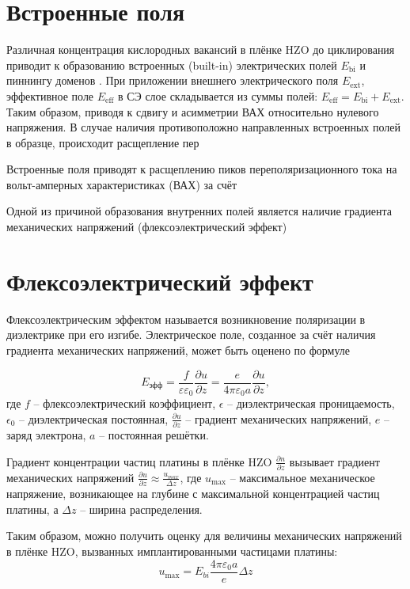 \section{Встроенные поля}

Различная концентрация кислородных вакансий в плёнке HZO до циклирования приводит к образованию встроенных (built-in) электрических полей \(E_\text{bi}\) и пиннингу доменов . При приложении внешнего электрического поля \(E_\text{ext}\), эффективное поле \(E_\text{eff}\) в СЭ слое складывается из суммы полей: \(E_\text{eff} = E_\text{bi} + E_\text{ext}\). Таким образом, приводя к сдвигу и асимметрии ВАХ относительно нулевого напряжения. В случае наличия противоположно направленных встроенных полей в образце, происходит расщепление пер

Встроенные поля приводят к расщеплению пиков переполяризационного тока на вольт-амперных характеристиках (ВАХ) за счёт

Одной из причиной образования внутренних полей является наличие градиента механических напряжений (флексоэлектрический эффект)

\section{Флексоэлектрический эффект}


Флексоэлектрическим эффектом называется возникновение поляризации в диэлектрике при его изгибе. Электрическое поле, созданное за счёт наличия градиента механических напряжений, может быть оценено по формуле \cite{gruvermanMechanicalStressEffect2003}

\[E_\text{эфф}=\frac{f}{\varepsilon\varepsilon_0}\frac{\partial u}{\partial z} = \frac{e}{4\pi\varepsilon_0 a}\frac{\partial u}{\partial z},\]
где \(f\) -- флексоэлектрический коэффициент, \(\epsilon\) -- диэлектрическая проницаемость, \(\epsilon_0\) -- диэлектрическая постоянная, \(\frac{\partial u}{\partial z}\) -- градиент механических напряжений, \(e\) -- заряд электрона, \(a\) -- постоянная решётки.

Градиент концентрации частиц платины в плёнке HZO \(\frac{\partial n}{\partial z}\) вызывает градиент механических напряжений \(\frac{\partial u}{\partial z}\approx\frac{u_{max}}{\Delta z}\), где \(u_\text{max}\) -- максимальное механическое напряжение, возникающее на глубине с максимальной концентрацией частиц платины, а \(\Delta z\) -- ширина распределения.

Таким образом, можно получить оценку для величины механических напряжений в плёнке HZO, вызванных имплантированными частицами платины:
\[u_\text{max}= E_{bi}\frac{4\pi\varepsilon_0 a}{e}\Delta z\]

